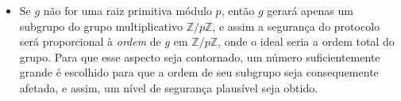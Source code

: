\documentclass{article}
\begin{document}
\begin{itemize}
\item Se $g$ não for uma raiz primitiva módulo $p$, então $g$ gerará apenas um
subgrupo do grupo multiplicativo $\mathbb{Z}/p\mathbb{Z}$, e assim a segurança
do protocolo será proporcional à \emph{ordem} de $g$ em
$\mathbb{Z}/p\mathbb{Z}$, onde o ideal seria a ordem total do grupo. Para que
esse aspecto seja contornado, um número suficientemente grande é escolhido para
que a ordem de seu subgrupo seja consequemente afetada, e assim, um nível de
segurança plausível seja obtido.

\end{itemize}



\end{document}
